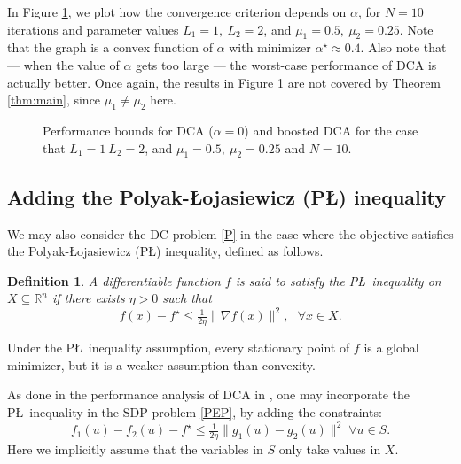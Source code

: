 \documentclass{article} %
\newtheorem{dfn}{Definition}
\renewcommand{\leq}{\leqslant}
\begin{document}
In Figure \ref{fig:3}, we plot how the convergence criterion depends on $\alpha$, for $N=10$ iterations and
parameter values $L_1=1,\ L_2=2$, and $\mu_1=0.5,\ \mu_2=0.25$. Note that the graph is a convex function of $\alpha$ with minimizer $\alpha^\star \approx 0.4$. Also note
that --- when the value of $\alpha$ gets too large --- the worst-case performance of DCA is actually better.
{Once again, the results in Figure \ref{fig:3} are not covered by Theorem \ref{thm:main}, since $\mu_1\neq \mu_2$ here.
}
\begin{figure}[h!]
\centering
{}
\caption{\label{fig:3} Performance bounds for DCA ($\alpha=0$) and boosted DCA for the case that $L_1=1\ L_2=2$, and $\mu_1=0.5,\ \mu_2=0.25$ and $N=10$.}
\end{figure}


\subsection*{Adding the Polyak-\L ojasiewicz (P{\L}) inequality}
We may also consider the DC problem \eqref{P} in the case where the objective satisfies the Polyak-\L ojasiewicz (P{\L}) inequality,
defined as follows.

\begin{dfn}
A differentiable function $f$ is said to satisfy the P{\L}\ inequality on $X\subseteq \mathbb{R}^n$ if there exists $\eta>0$ such that
\[
f(x)-f^\star \leq \tfrac{1}{2\eta} \| \nabla f(x)\|^2, \ \ \ \forall x\in X.
\]
\end{dfn}
Under the P{\L}\ inequality assumption, every stationary point of $f$ is a global minimizer, but
it
is  a weaker assumption  than convexity.

As done in the performance analysis of DCA in \cite{abbaszad2024DCA}, one may
incorporate  the P{\L}\ inequality in the SDP problem \eqref{PEP}, by adding the constraints:
\begin{equation}
\label{PL constraint}
f_1(u) - f_2(u) -f^\star \leq \tfrac{1}{2\eta} \| g_1(u) - g_2(u)\|^2 \; \forall u \in S.
\end{equation}
Here we implicitly assume that the variables in $S$ only take values in $X$.
\end{document}

